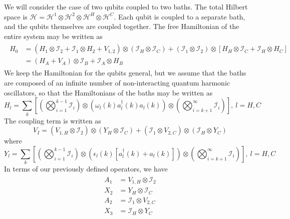 \documentclass{article}
\newcommand{\ten}{\otimes}
\newcommand{\I}{\mathcal{I}}
\begin{document}
We will consider the case of two qubits coupled to two baths. The total Hilbert space is $\mathcal{H} = \mathcal{H}^1\ten\mathcal{H}^2\ten\mathcal{H}^H\ten\mathcal{H}^C$. Each qubit is coupled to a separate bath, and the qubits themselves are coupled together. The free Hamiltonian of the entire system may be written as
\begin{align}\label{freeham}
\begin{split}
H_0 &= (H_1\ten \I_2 + \I_1\ten H_2 + V_{1,2})\ten(\I_H\ten \I_C) + (\I_1\ten \I_2)\ten\left[H_H\ten \I_C + \I_H\ten H_C\right]\\
&= (H_A+V_A)\ten \I_B + \I_A\ten H_B
\end{split}
\end{align}
We keep the Hamiltonian for the qubits general, but we assume that the baths are composed of an infinite number of non-interacting quantum harmonic oscillators, so that the Hamiltonians of the baths may be written as
\begin{equation}\label{bathham}
H_l = \sum_k\left[\left(\bigotimes_{i=1}^{k-1}\I_i\right)\ten\left(\omega_l(k) a_l^{\dag}(k)a_l(k)\right)\ten\left(\bigotimes_{i=k+1}^{\infty}\I_i\right)\right],\ l = H,C
\end{equation}
The coupling term is written as
\begin{equation}\label{modcoup}
V_I = \left(V_{1,H}\ten \I_2\right)\ten\left(Y_H\ten \I_C\right) + \left(\I_1\ten V_{2,C}\right)\ten\left(\I_H\ten Y_C\right)
\end{equation}
where
\begin{equation}\label{yl}
Y_l = \sum_k\left[\left(\bigotimes_{i=1}^{k-1}\I_i\right)\ten\left(\epsilon_l(k)\left[a_l^{\dag}(k) + a_l(k)\right]\right)\ten\left(\bigotimes_{i=k+1}^{\infty}\I_i\right)\right],\ l = H,C
\end{equation}
In terms of our previously defined operators, we have
\begin{align}\label{AXop}
\begin{split}
	A_1 &= V_{1,H}\ten \I_2\\
	X_2 &= Y_H\ten \I_C\\
	A_2 &= \I_1\ten V_{2,C}\\
	X_3 &= \I_H\ten Y_C
\end{split}
\end{align}
\end{document}
